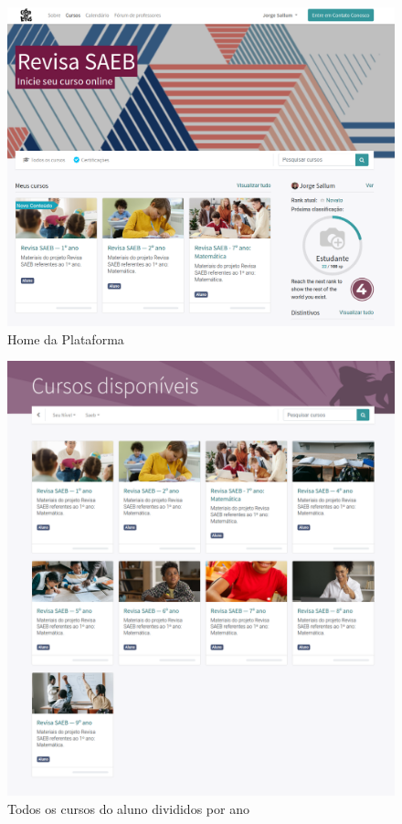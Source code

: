 \mbox{}

\begin{figure}[h]
\includegraphics[width=\textwidth]{imgs/front}
\caption{Home da Plataforma}
\end{figure}



\begin{figure}[H]
\includegraphics[width=\textwidth]{imgs/cursos}
\caption{Todos os cursos do aluno divididos por ano}
\end{figure}


